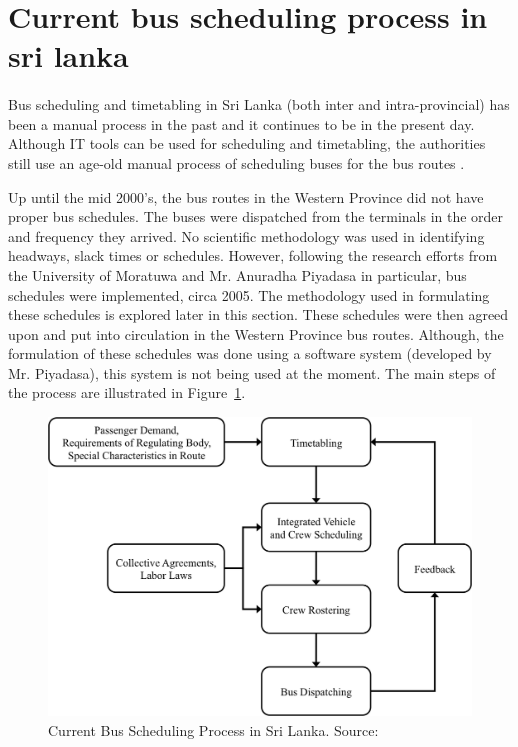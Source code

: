 \section{Current bus scheduling process in sri lanka}
\label{section-CurrentBusSchedulingProcessInSriLanka}

\paragraph{ } Bus scheduling and timetabling in Sri Lanka (both inter and intra-provincial) has been a manual process in the past and it continues to be in the present day. Although IT tools can be used for scheduling and timetabling, the authorities still use an age-old manual process of scheduling buses for the bus routes \cite{Mahesh2013a, Theja2013a, Mahesh2013b}.

Up until the mid 2000's, the bus routes in the Western Province did not have proper bus schedules. The buses were dispatched from the terminals in the order and frequency they arrived. No scientific methodology was used in identifying headways, slack times or schedules. However, following the research efforts from the University of Moratuwa and Mr. Anuradha Piyadasa in particular, bus schedules were implemented, circa 2005. The methodology used in formulating these schedules is explored later in this section. These schedules were then agreed upon and put into circulation in the Western Province bus routes. Although, the formulation of these schedules was done using a software system (developed by Mr. Piyadasa), this system is not being used at the moment. The main steps of the process are illustrated in Figure~\ref{image-currentBusSchedulingProcess}.

\begin{figure}[H]
\centering
\includegraphics [scale=0.7] {currentBusSchedulingProcess}
\caption[Current Bus Scheduling Process in SL]{Current Bus Scheduling Process in Sri Lanka. Source: \cite{Piyadasa2005}}
\label{image-currentBusSchedulingProcess}
\end{figure}

